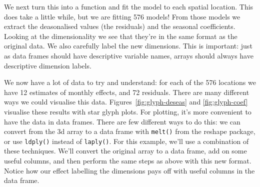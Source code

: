 \documentclass{scrartcl}
\newcommand{\f}[1]{\lstinline!#1()!}
\begin{document}
% 
%


%


We next turn this into a function and fit the model to each spatial location.  This does take a little while, but we are fitting 576 models!  From those models we extract the deasonalised values (the residuals) and the seasonal coefficients.  Looking at the dimensionality we see that they're in the same format as the original data.  We also carefully label the new dimensions.  This is important: just as data frames should have descriptive variable names, arrays should always have descriptive dimension labels.

% 
% 
% 
% 


We now have a lot of data to try and understand: for each of the 576 locations we have 12 estimates of monthly effects, and 72 residuals.  There are many different ways we could visualise this data.  Figures~\ref{fig:glyph-deseas} and \ref{fig:glyph-coef} visualise these results with star glyph plots.  For plotting, it's more convenient to have the data in data frames.  There are few different ways to do this: we can convert from the 3d array to a data frame with \f{melt} from the reshape package, or use \f{ldply} instead of \f{laply}.  For this example, we'll use a combination of these techniques.  We'll convert the original array to a data frame, add on some useful columns, and then perform the same steps as above with this new format.  Notice how our effect labelling the dimensions pays off with useful columns in the data frame.

% 
% 
%  

\end{document}
